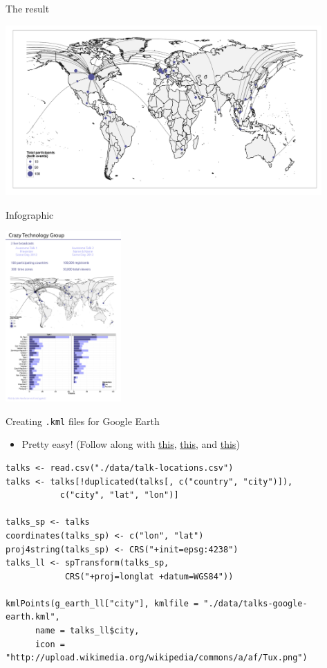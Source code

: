 \documentclass[sans,aspectratio=169,presentation,bigger,fleqn]{beamer}
\begin{document}
\begin{frame}[label=sec-20]{The result}
\normalsize


\begin{center}
\includegraphics[height=6.5cm]{./img/great-circles.pdf}
\end{center}
\end{frame}
\begin{frame}[label=sec-21]{Infographic}
\begin{center}
\includegraphics[height=6.5cm]{./img/infographic-flattened-lo.jpg}
\end{center}
\end{frame}
\begin{frame}[fragile,label=sec-22]{Creating \texttt{.kml} files for Google Earth}
 \begin{itemize}
\item Pretty easy! (Follow along with \href{http://www.nceas.ucsb.edu/scicomp/usecases/shapeFileToKML}{this}, \href{http://stackoverflow.com/questions/7813141/how-to-create-a-kml-file-using-r}{this}, and \href{http://stackoverflow.com/questions/21487010/assistance-with-name-and-styleurl-in-kml-when-using-writeogr-from-rgdal}{this})
\end{itemize}

\scriptsize
\begin{verbatim}
talks <- read.csv("./data/talk-locations.csv")
talks <- talks[!duplicated(talks[, c("country", "city")]),
	       c("city", "lat", "lon")]

talks_sp <- talks
coordinates(talks_sp) <- c("lon", "lat")
proj4string(talks_sp) <- CRS("+init=epsg:4238")
talks_ll <- spTransform(talks_sp,
			CRS("+proj=longlat +datum=WGS84"))

kmlPoints(g_earth_ll["city"], kmlfile = "./data/talks-google-earth.kml",
	  name = talks_ll$city,
	  icon = "http://upload.wikimedia.org/wikipedia/commons/a/af/Tux.png")
\end{verbatim}
\normalsize
\end{frame}
\end{document}
